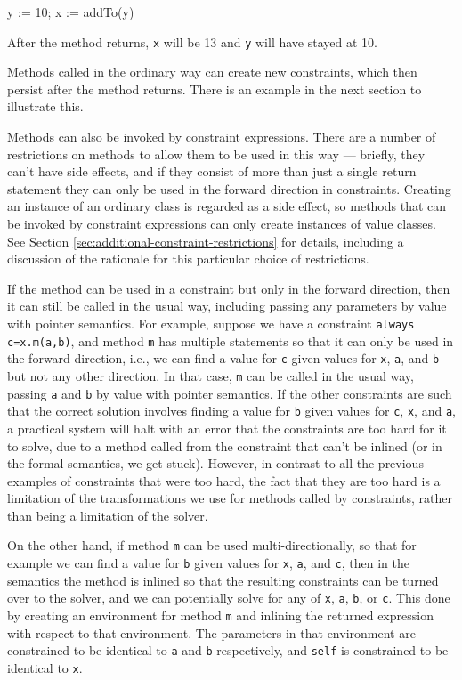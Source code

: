 \documentclass{article}
\newcounter{examples}
\begin{document}
\begin{example}
y := 10;
x := addTo(y)
\end{example}
After the method returns, \verb!x! will be 13 and \verb!y! will have
stayed at 10.

Methods called in the ordinary way can create new constraints, which
then persist after the method returns.  There is an example in the
next section to illustrate this.

Methods can also be invoked by constraint expressions.  There are a
number of restrictions on methods to allow them to be used in this way
--- briefly, they can't have side effects, and if they consist of more
than just a single return statement they can only be used in the
forward direction in constraints.  Creating an instance of an ordinary
class is regarded as a side effect, so methods that can be invoked by
constraint expressions can only create instances of value classes.
See Section \ref{sec:additional-constraint-restrictions} for details,
including a discussion of the rationale for this particular choice of
restrictions.

If the method can be used in a constraint but only in the forward
direction, then it can still be called in the usual way, including
passing any parameters by value with pointer semantics.  For example,
suppose we have a constraint \verb|always c=x.m(a,b)|, and method
\verb|m| has multiple statements so that it can only be used in the
forward direction, i.e., we can find a value for \verb|c| given values
for \verb|x|, \verb|a|, and \verb|b| but not any other direction.  In
that case, \verb|m| can be called in the usual way, passing \verb|a|
and \verb|b| by value with pointer semantics.  If the other
constraints are such that the correct solution involves finding a
value for \verb|b| given values for \verb|c|, \verb|x|, and \verb|a|,
a practical system will halt with an error that the constraints are
too hard for it to solve, due to a method called from the constraint
that can't be inlined (or in the formal semantics, we get stuck).
However, in contrast to all the previous examples of constraints that
were too hard, the fact that they are too hard is a limitation of the
transformations we use for methods called by constraints, rather than
being a limitation of the solver.

On the other hand, if method \verb|m| can be used multi-directionally,
so that for example we can find a value for \verb|b| given values for
\verb|x|, \verb|a|, and \verb|c|, then in the semantics the method is
inlined so that the resulting constraints can be turned over to the
solver, and we can potentially solve for any of \verb|x|, \verb|a|,
\verb|b|, or \verb|c|\@.  This done by creating an environment for
method \verb|m| and inlining the returned expression with respect to
that environment. The parameters in that environment are constrained
to be identical to \verb|a| and \verb|b| respectively, and \verb|self|
is constrained to be identical to \verb|x|.
\end{document}
